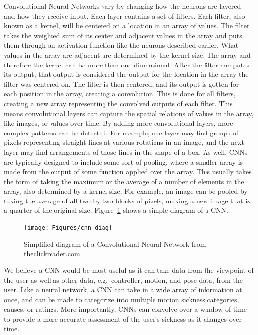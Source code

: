 Convolutional Neural Networks vary by changing how the neurons are layered and how they receive input.
Each layer contains a set of filters.
Each filter, also known as a kernel, will be centered on a location in an array of values.
The filter takes the weighted sum of its center and adjacent values in the array and puts them through an activation function like the neurons described earlier.
What values in the array are adjacent are determined by the kernel size.
The array and therefore the kernel can be more than one dimensional.
After the filter computes its output, that output is considered the output for the location in the array the filter was centered on.
The filter is then centered, and its output is gotten for each position in the array, creating a convolution.
This is done for all filters, creating a new array representing the convolved outputs of each filter.
This means convolutional layers can capture the spatial relations of values in the array, like images, or values over time.
By adding more convolutional layers, more complex patterns can be detected.
For example, one layer may find groups of pixels representing straight lines at various rotations in an image, and the next layer may find arrangements of those lines in the shape of a box.
As well, CNNs are typically designed to include some sort of pooling, where a smaller array is made from the output of some function applied over the array.
This usually takes the form of taking the maximum or the average of a number of elements in the array, also determined by a kernel size.
For example, an image can be pooled by taking the average of all two by two blocks of pixels, making a new image that is a quarter of the original size.
Figure~\ref{fig:cnn_example} shows a simple diagram of a CNN\cite{theclickreaderIntroductionConvolutional}.

\begin{figure}[h!]
    \texttt{[image: Figures/cnn\_diag]}
    \centering
    \caption{Simplified diagram of a Convolutional Neural Network from theclickreader.com}
    \label{fig:cnn_example}
\end{figure}

We believe a CNN would be most useful as it can take data from the viewpoint of the user as well as other data, e.g.~controller, motion, and pose data, from the user.
Like a neural network, a CNN can take in a wide array of information at once, and can be made to categorize into multiple motion sickness categories, causes, or ratings.
More importantly, CNNs can convolve over a window of time to provide a more accurate assessment of the user's sickness as it changes over time.

